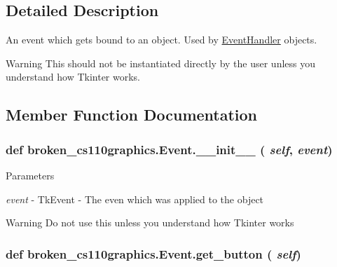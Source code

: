 \subsection{Detailed Description}
An event which gets bound to an object. Used by \hyperlink{classbroken__cs110graphics_1_1EventHandler}{EventHandler} objects. \begin{DoxyWarning}{Warning}
This should not be instantiated directly by the user unless you understand how Tkinter works. 
\end{DoxyWarning}


\subsection{Member Function Documentation}
\hypertarget{classbroken__cs110graphics_1_1Event_a45e8fa8a01a5e575df29be5f00447170}{
\subsubsection[{\_\-\_\-init\_\-\_\-}]{\setlength{\rightskip}{0pt plus 5cm}def broken\_\-cs110graphics.Event.\_\-\_\-init\_\-\_\- ( {\em self}, \/   {\em event})}}
\label{classbroken__cs110graphics_1_1Event_a45e8fa8a01a5e575df29be5f00447170}

\begin{DoxyParams}{Parameters}
\item[{\em event}]-\/ TkEvent -\/ The even which was applied to the object \end{DoxyParams}
\begin{DoxyWarning}{Warning}
Do not use this unless you understand how Tkinter works 
\end{DoxyWarning}
\hypertarget{classbroken__cs110graphics_1_1Event_a942d58ca72c232b00a24a81a7ad6aa95}{
\subsubsection[{get\_\-button}]{\setlength{\rightskip}{0pt plus 5cm}def broken\_\-cs110graphics.Event.get\_\-button ( {\em self})}}
\label{classbroken__cs110graphics_1_1Event_a942d58ca72c232b00a24a81a7ad6aa95}


